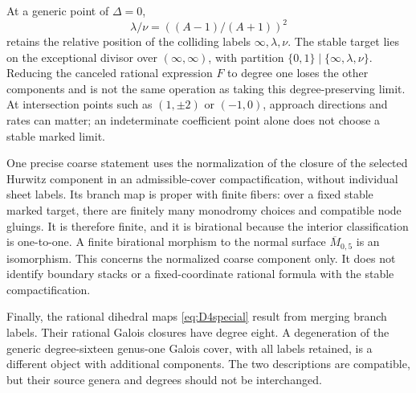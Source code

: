At a generic point of \(\Delta=0\),
\[
\lambda/\nu=((A-1)/(A+1))^2
\]
retains the relative position of the colliding labels \(\infty,\lambda,\nu\). The stable target lies on the exceptional divisor over \((\infty,\infty)\), with partition \(\{0,1\}\mid\{\infty,\lambda,\nu\}\). Reducing the canceled rational expression \(F\) to degree one loses the other components and is not the same operation as taking this degree-preserving limit. At intersection points such as \((1,\pm2)\) or \((-1,0)\), approach directions and rates can matter; an indeterminate coefficient point alone does not choose a stable marked limit.

One precise coarse statement uses the normalization of the closure of the selected Hurwitz component in an admissible-cover compactification, without individual sheet labels. Its branch map is proper with finite fibers: over a fixed stable marked target, there are finitely many monodromy choices and compatible node gluings. It is therefore finite, and it is birational because the interior classification is one-to-one. A finite birational morphism to the normal surface \(\overline M_{0,5}\) is an isomorphism. This concerns the normalized coarse component only. It does not identify boundary stacks or a fixed-coordinate rational formula with the stable compactification.

Finally, the rational dihedral maps \eqref{eq:D4special} result from merging branch labels. Their rational Galois closures have degree eight. A degeneration of the generic degree-sixteen genus-one Galois cover, with all labels retained, is a different object with additional components. The two descriptions are compatible, but their source genera and degrees should not be interchanged.
